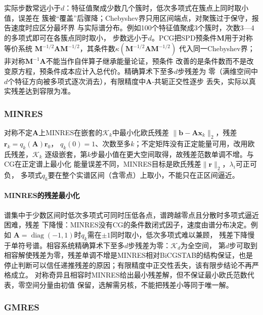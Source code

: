 实际步数常远小于$d$：特征值聚成少数几个簇时，低次多项式在簇点上同时取小值，误差在
簇被“覆盖”后骤降；Chebyshev界只用区间端点，对聚簇过于保守，报告速度时应区分最坏界
与实际谱分布。例如100个特征值聚成3个簇时，次数3—4的多项式即可在各簇点同时取小，
步数远小于$d$。PCG把SPD预条件$\bm M$用于对称等价系统
$\bm M^{-1/2}\bm A\bm M^{-1/2}$，其条件数$\kappa(\bm M^{-1/2}\bm A\bm M^{-1/2})$
代入同一Chebyshev界；非对称$\bm M^{-1}\bm A$不能当作自伴算子继承能量论证，预条件
改善的是条件数而不是改变原方程，预条件成本应计入总代价。精确算术下至多$d$步残差为
零（满维空间中$d$个特征方向被多项式逐次消去），有限精度中$\bm A$-共轭正交性逐步
丢失，实际以真实残差达到容限为准。

\subsubsection{MINRES}

对称不定$\bm A$上MINRES在嵌套的$\mathcal K_k$中最小化欧氏残差
$\lVert\bm b-\bm A\bm x_k\rVert_2$，残差$\bm r_k=q_k(\bm A)\bm r_0$，
$q_k(0)=1$、次数至多$k$；不定矩阵没有正定能量可用，改用欧氏残差，$\mathcal K_k$
逐级嵌套，第$k$步最小值在更大空间取得，故残差范数单调不增。与CG在正定谱上最小化
能量误差不同，MINRES目标是欧氏残差$\lVert\bm r\rVert_2$，$\lambda_i$可正可负，
多项式$q_k$要在整个实谱区间（含零点）上取小，不能只在正区间逼近。

\paragraph{MINRES的残差最小化}

谱集中于少数区间时低次多项式可同时压低各点，谱跨越零点且分散时多项式逼近困难，残差
下降慢：MINRES没有CG的条件数闭式因子，速度由谱分布决定。例如
$\bm A=\operatorname{diag}(-1,1)$时$q_k$需在$\pm1$同时取小，低次多项式难以兼顾，
残差下降慢于单符号谱。相容系统精确算术下至多$d$步残差为零：$\mathcal K_d$为全空间，
第$d$步可取到相容解使残差为零，残差单调不增是MINRES相对BiCGSTAB的结构保证，也是
停止判断可以信任递推残差的原因；有限精度中正交性丢失，该有限步结论不再严格成立。
对称奇异且相容时MINRES给出最小残差解，但不保证最小欧氏范数代表，零空间分量由初值
保留，选解需另核，不能把残差小等同于唯一解。

\subsubsection{GMRES}

